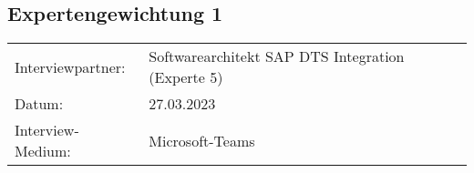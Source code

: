         \subsection{Expertengewichtung 1}
        \label{sec:Expertengewichtung}
                \begin{tabular}{ l l }
            Interviewpartner: & Softwarearchitekt SAP DTS Integration (Experte 5)\\
            Datum: & 27.03.2023\\
            Interview-Medium: & Microsoft-Teams\\
    \end{tabular}
    \begin{center}
        \begin{figure}[H]
            \centering
            \label{fig:gew_11}
        \end{figure}	
    \end{center}
    \begin{center}
        \begin{figure}[H]
            \centering
            \label{fig:gew_12}
        \end{figure}	
    \end{center}

